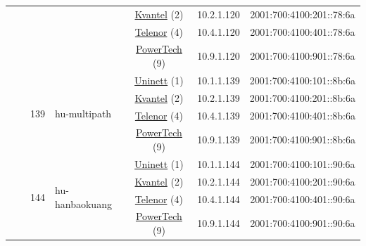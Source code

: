 \begin{small}
\begin{center}
\begin{longtable}{|c|c|c|c|c|c|c|c|}
  &  &  &  & \multicolumn{2}{|c|}{\tiny{\href{http://kvantel.no}{Kvantel} (2)}} & \tiny{10.2.1.120} & \tiny{2001:700:4100:201::78:6a} \\* \cline{5-5}\cline{6-6}\cline{7-7}\cline{8-8}
  &  &  &  & \multicolumn{2}{|c|}{\tiny{\href{https://www.telenor.no}{Telenor} (4)}} & \tiny{10.4.1.120} & \tiny{2001:700:4100:401::78:6a} \\* \cline{5-5}\cline{6-6}\cline{7-7}\cline{8-8}
  &  &  &  & \multicolumn{2}{|c|}{\tiny{\href{http://www.powertech.no}{PowerTech} (9)}} & \tiny{10.9.1.120} & \tiny{2001:700:4100:901::78:6a} \\* \cline{3-3}\cline{4-4}\cline{5-5}\cline{6-6}\cline{7-7}\cline{8-8}
  &  & \multirow{4}{*}{\tiny{139}} & \multicolumn{1}{|l|}{\multirow{4}{*}{\tiny{hu-multipath}}} & \multicolumn{2}{|c|}{\tiny{\href{https://www.uninett.no}{Uninett} (1)}} & \tiny{10.1.1.139} & \tiny{2001:700:4100:101::8b:6a} \\* \cline{5-5}\cline{6-6}\cline{7-7}\cline{8-8}
  &  &  &  & \multicolumn{2}{|c|}{\tiny{\href{http://kvantel.no}{Kvantel} (2)}} & \tiny{10.2.1.139} & \tiny{2001:700:4100:201::8b:6a} \\* \cline{5-5}\cline{6-6}\cline{7-7}\cline{8-8}
  &  &  &  & \multicolumn{2}{|c|}{\tiny{\href{https://www.telenor.no}{Telenor} (4)}} & \tiny{10.4.1.139} & \tiny{2001:700:4100:401::8b:6a} \\* \cline{5-5}\cline{6-6}\cline{7-7}\cline{8-8}
  &  &  &  & \multicolumn{2}{|c|}{\tiny{\href{http://www.powertech.no}{PowerTech} (9)}} & \tiny{10.9.1.139} & \tiny{2001:700:4100:901::8b:6a} \\* \cline{3-3}\cline{4-4}\cline{5-5}\cline{6-6}\cline{7-7}\cline{8-8}
  &  & \multirow{4}{*}{\tiny{144}} & \multicolumn{1}{|l|}{\multirow{4}{*}{\tiny{hu-hanbaokuang}}} & \multicolumn{2}{|c|}{\tiny{\href{https://www.uninett.no}{Uninett} (1)}} & \tiny{10.1.1.144} & \tiny{2001:700:4100:101::90:6a} \\* \cline{5-5}\cline{6-6}\cline{7-7}\cline{8-8}
  &  &  &  & \multicolumn{2}{|c|}{\tiny{\href{http://kvantel.no}{Kvantel} (2)}} & \tiny{10.2.1.144} & \tiny{2001:700:4100:201::90:6a} \\* \cline{5-5}\cline{6-6}\cline{7-7}\cline{8-8}
  &  &  &  & \multicolumn{2}{|c|}{\tiny{\href{https://www.telenor.no}{Telenor} (4)}} & \tiny{10.4.1.144} & \tiny{2001:700:4100:401::90:6a} \\* \cline{5-5}\cline{6-6}\cline{7-7}\cline{8-8}
  &  &  &  & \multicolumn{2}{|c|}{\tiny{\href{http://www.powertech.no}{PowerTech} (9)}} & \tiny{10.9.1.144} & \tiny{2001:700:4100:901::90:6a} \\* \cline{3-3}\cline{4-4}\cline{5-5}\cline{6-6}\cline{7-7}\cline{8-8}

\end{longtable}
\end{center}
\end{small}
